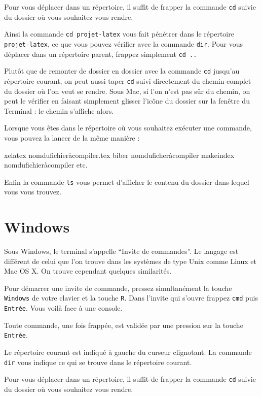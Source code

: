 Pour vous déplacer dans un répertoire, il suffit de frapper la commande
\verb|cd| suivie du dossier où vous souhaitez vous rendre.

Ainsi la commande \verb|cd projet-latex| vous fait pénétrer dans le
répertoire \verb|projet-latex|, ce que vous pouvez vérifier avec la
commande \verb|dir|. Pour vous déplacer dans un répertoire parent, frappez
simplement \verb|cd ..|

Plutôt que de remonter de dossier en dossier avec la commande \verb|cd| jusqu'au répertoire courant, on peut aussi  taper  \verb|cd| suivi directement du chemin complet du dossier où l'on veut se rendre. Sous Mac, si l'on n'est pas sûr du chemin, on peut le vérifier en faisant simplement glisser l'icône du dossier sur la fenêtre du Terminal : le chemin s'affiche alors.

Lorsque vous êtes dans le répertoire où vous souhaitez exécuter une
commande, vous pouvez la lancer de la même manière :

\begin{bashcode}
xelatex nomdufichieràcompiler.tex
biber nomduficheràcompiler
makeindex nomdufichieràcompiler
etc.
\end{bashcode}

Enfin la commande \verb|ls| vous permet d'afficher le contenu du dossier dans lequel vous vous trouvez.

\section{Windows}
Sous Windows, le terminal s'appelle \enquote{Invite de commandes}. Le langage
est différent de celui que l'on trouve dans les systèmes de type Unix comme
Linux et Mac OS X. On trouve cependant quelques similarités.

Pour démarrer une invite de commande, pressez simultanément la touche \verb|Windows| de votre
clavier et la touche \verb|R|. Dans l'invite qui s'ouvre frappez \verb|cmd| puis
\verb|Entrée|. Vous voilà face à une console.

Toute commande, une fois frappée, est validée par une pression sur la touche \verb|Entrée|.

Le répertoire courant est indiqué à gauche du curseur clignotant.
La commande \verb|dir| vous indique ce qui se trouve dans le répertoire
courant.

Pour vous déplacer dans un répertoire, il suffit de frapper la commande
\verb|cd| suivie du dossier où vous souhaitez vous rendre.

